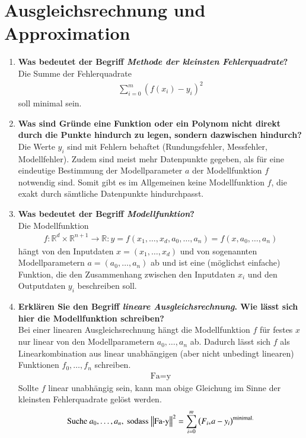 \section{Ausgleichsrechnung und Approximation}
	\begin{enumerate}
		\item \textbf{Was bedeutet der Begriff \textit{Methode der kleinsten Fehlerquadrate}?} \\
			Die Summe der Fehlerquadrate
			\begin{align*}
				\sum_{i=0}^{m}(f(x_i)-y_i)^2
			\end{align*}
			soll minimal sein.
		\item \textbf{Was sind Gründe eine Funktion oder ein Polynom nicht direkt durch die Punkte hindurch zu legen, sondern dazwischen hindurch?} \\
			Die Werte \(y_i\) sind mit Fehlern behaftet (Rundungsfehler, Messfehler, Modellfehler). Zudem sind meist mehr Datenpunkte gegeben, als für eine eindeutige Bestimmung der Modellparameter \(a\)  der Modellfunktion \(f\) notwendig sind. Somit gibt es im Allgemeinen keine Modellfunktion \(f\), die exakt durch sämtliche Datenpunkte hindurchpasst.
		
		\item \textbf{Was bedeutet der Begriff \textit{Modellfunktion}?} \\
			Die Modellfunktion
			\begin{align*}
				f:\mathbb{R}^d\times\mathbb{R}^{n+1}\rightarrow\mathbb{R}:y=f(x_1,\dots,x_d,a_0,\dots,a_n)=f(x,a_0,\dots,a_n)
			\end{align*}
			hängt von den Inputdaten \(x=(x_1,\dots,x_d)\) und von sogenannten Modellparametern \(a=(a_0,\dots,a_n)\) ab und ist eine (möglichst einfache) Funktion, die den Zusammenhang zwischen den Inputdaten \(x_i\) und den Outputdaten \(y_i\) beschreiben soll.
		
		\item \textbf{Erklären Sie den Begriff \textit{lineare Ausgleichsrechnung}. Wie lässt sich hier die Modellfunktion schreiben?} \\
			Bei einer linearen Ausgleichsrechnung hängt die Modellfunktion \(f\) für festes \(x\) nur linear von den Modellparametern \(a_0,\dots,a_n\) ab. Dadurch lässt sich \(f\) als Linearkombination aus linear unabhängigen (aber nicht unbedingt linearen) Funktionen \(f_0,\dots,f_n\) schreiben.
			\begin{align*}
				\text{Fa}=\text{y}
			\end{align*}
			Sollte \(f\) linear unabhängig sein, kann man obige Gleichung im Sinne der kleinsten Fehlerquadrate gelöst werden.
			\begin{align*}
				\text{Suche } a_0,\dots,a_n,\text{ sodass } \norm{\text{Fa-y}}^2=\sum_{i=0}^{m}\left(F_{i*}a-y_i\right)^ \text{minimal.}
			\end{align*}
		

\end{enumerate}
